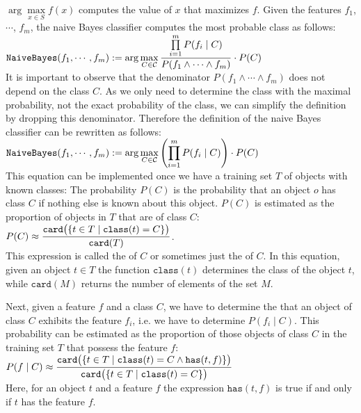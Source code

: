 $\arg\max\limits_{x \in S} f(x)$ computes the value of $x$ that maximizes $f$.  Given the features  $f_1$, $\cdots$,
$f_m$, the naive Bayes classifier computes the most probable class as follows:
\\[0.2cm]
\hspace*{1.3cm}
$\displaystyle \texttt{NaiveBayes}(f_1,\cdots,f_m) :=
  \arg\max\limits_{C \in \mathcal{C}}  \frac{\prod\limits_{i=1}^m P(f_i \;|\; C)}{P(f_1 \wedge \cdots \wedge f_m)} \cdot P(C) 
$
\\[0.2cm]
It is important to observe that the denominator $P(f_1 \wedge \cdots \wedge f_m)$ does not depend on the class
$C$.  As we only need to determine the class with the maximal probability, not the exact probability of the
class, we can simplify the definition by dropping this denominator.  Therefore the definition of the naive
Bayes classifier can be rewritten as follows:
\\[0.2cm]
\hspace*{1.3cm}
$\displaystyle \texttt{NaiveBayes}(f_1,\cdots,f_m) :=
  \arg\max\limits_{C \in \mathcal{C}}  \left(\prod\limits_{i=1}^m P(f_i \;|\; C)\right) \cdot P(C) 
$
\\[0.2cm]
This equation can be implemented once we have a training set $T$ of objects with known classes:  
The probability $P(C)$ is the probability that an object $o$ has class $C$
if nothing else is known about this object.  $P(C)$ is estimated as the proportion of objects in $T$ that are
of class $C$:
\\[0.2cm]
\hspace*{1.3cm}
$ \displaystyle P(C) \approx \frac{\texttt{card}\bigl(\{t \in T \;|\; \texttt{class}(t) = C \}\bigr)}{\texttt{card}(T)}$.
\\[0.2cm]
This expression is called the  of $C$ or sometimes just the  of $C$.
In this equation, given an object $t\in T$ the function $\texttt{class}(t)$ determines the class of the object
$t$, while $\texttt{card}(M)$ returns the number of elements of the set $M$.

Next, given a feature $f$ and a class $C$, we have to determine the  that an
object of class $C$ exhibits the feature $f_i$, i.e. we have to determine $P(f_i \;|\; C)$.
This probability can be estimated as the proportion of those objects of class $C$ in the training set $T$ that
possess the feature $f$:
\\[0.2cm]
\hspace*{1.3cm}
$\displaystyle P(f\;|\;C) \approx 
 \frac{\texttt{card}\bigl(\{t \in T \;|\; \texttt{class}(t) = C \wedge \texttt{has}(t, f) \}\bigr)}{
       \texttt{card}\bigl(\{t \in T \;|\; \texttt{class}(t) = C \}\bigr)} 
$
\\[0.2cm]
Here, for an object $t$ and a feature $f$ the expression $\texttt{has}(t, f)$ is true if and only if $t$ has
the feature $f$.


